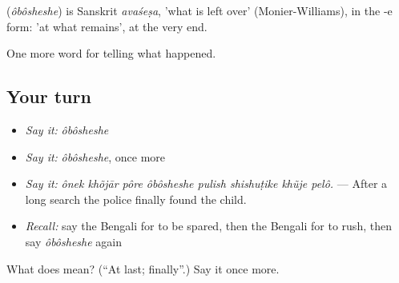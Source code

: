 \begin{cousinweb}
\textbf{} (\emph{ôbôsheshe}) is Sanskrit \emph{avaśeṣa}, 'what is left over' (Monier-Williams), in the -e form: 'at what remains', at the very end.
\end{cousinweb}

\begin{grammarlens}[title={What you've built}]
One more word for telling what happened.
\end{grammarlens}

\subsection*{Your turn}
\begin{itemize}
\raggedright
  \item \emph{Say it:} \emph{ôbôsheshe}
  \item \emph{Say it:} \emph{ôbôsheshe}, once more
  \item \emph{Say it:} \emph{ônek khõjār pôre ôbôsheshe pulish shishuṭike khũje pelô.} — After a long search the police finally found the child.
  \item \emph{Recall:} say the Bengali for to be spared, then the Bengali for to rush, then say \emph{ôbôsheshe} again
\end{itemize}

\begin{tcolorbox}[breakable,colback=teal!4,colframe=teal!35!black,title={Before you move on}]
What does  mean? (\textquotedblleft{}At last; finally\textquotedblright{}.) Say it once more.
\end{tcolorbox}
